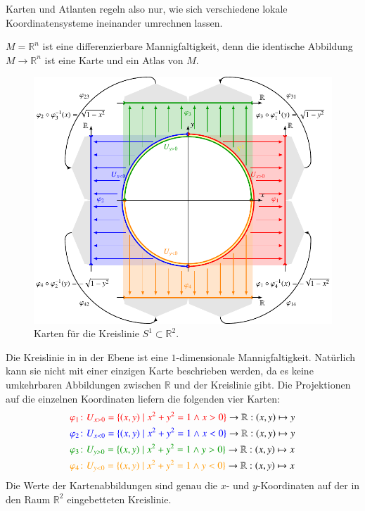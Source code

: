 Karten und Atlanten regeln also nur, wie sich verschiedene lokale
Koordinatensysteme ineinander umrechnen lassen.

\begin{beispiel}
$M=\mathbb{R}^n$ ist eine differenzierbare Mannigfaltigkeit, denn 
die identische Abbildung $M\to \mathbb{R}^n$ ist eine Karte und ein
Atlas von $M$.
\end{beispiel}

\begin{beispiel}
\begin{figure}
\centering
\includegraphics{chapters/60-gruppen/images/kartenkreis.pdf}
\caption{Karten für die Kreislinie $S^1\subset\mathbb{R}^2$.
\label{buch:gruppen:fig:kartenkreis}}
\end{figure}
Die Kreislinie in in der Ebene ist eine $1$-dimensionale Mannigfaltigkeit.
Natürlich kann sie nicht mit einer einzigen Karte beschrieben werden,
da es keine umkehrbaren Abbildungen zwischen $\mathbb{R}$ und der Kreislinie
gibt.
Die Projektionen auf die einzelnen Koordinaten liefern die folgenden
vier Karten:
\begin{align*}
\color{red}
\varphi_1&{\color{red}\colon U_{x>0}=\{(x,y) \mid x^2+y^2=1\wedge x>0\}}\to\mathbb{R}
:
(x,y) \mapsto y
\\
\color{blue}
\varphi_2&{\color{blue}\colon U_{x<0}=\{(x,y) \mid x^2+y^2=1\wedge x<0\}}\to\mathbb{R}
:
(x,y) \mapsto y
\\
\color{darkgreen}
\varphi_3&{\color{darkgreen}\colon U_{y>0}=\{(x,y) \mid x^2+y^2=1\wedge y>0\}}\to\mathbb{R}
:
(x,y) \mapsto x
\\
\color{orange}
\varphi_4&{\color{orange}\colon U_{y<0}=\{(x,y) \mid x^2+y^2=1\wedge y<0\}}\to\mathbb{R}
:
(x,y) \mapsto x
\end{align*}
Die Werte der Kartenabbildungen sind genau die $x$- und $y$-Koordinaten
auf der in den Raum $\mathbb{R}^2$ eingebetteten Kreislinie.


\end{beispiel}
